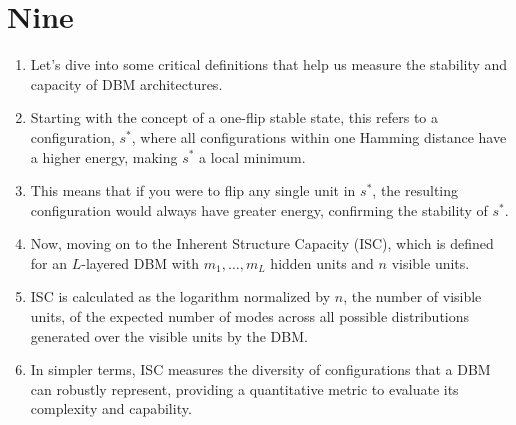 \documentclass{article}
\begin{document}
\section*{Nine}
\begin{enumerate}
    \item Let's dive into some critical definitions that help us measure the stability and capacity of DBM architectures.
    \item Starting with the concept of a one-flip stable state, this refers to a configuration, \( s^* \), where all configurations within one Hamming distance have a higher energy, making \( s^* \) a local minimum.
    \item This means that if you were to flip any single unit in \( s^* \), the resulting configuration would always have greater energy, confirming the stability of \( s^* \).
    \item Now, moving on to the Inherent Structure Capacity (ISC), which is defined for an \( L \)-layered DBM with \( m_1, \ldots, m_L \) hidden units and \( n \) visible units.
    \item ISC is calculated as the logarithm normalized by \( n \), the number of visible units, of the expected number of modes across all possible distributions generated over the visible units by the DBM.
    \item In simpler terms, ISC measures the diversity of configurations that a DBM can robustly represent, providing a quantitative metric to evaluate its complexity and capability.
\end{enumerate}
\end{document}
